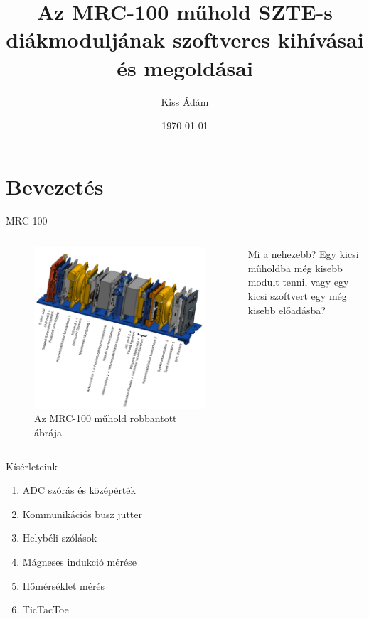 \documentclass[aspectratio=169,xcolor=dvipsnames]{beamer}
\title[short title]{Az MRC-100 műhold SZTE-s diákmoduljának szoftveres kihívásai és megoldásai} %
\subtitle{}
\author[Kiss Ádám] {Kiss Ádám}
\institute[NTU] %
{
Kiss Ádám\\
SZTE Móra Ferenc Szakkollégium\\
SZTE Elméleti Orvostudományok Doktori Iskola\\
SZTE SZAOK Élettani Intézet -- Szenzomotoros kutatólaboratórium
    \vskip 3pt
}
\date{\today} %
\begin{document}

\begin{frame}
    \titlepage
\end{frame}

\section{Bevezetés}
\begin{frame}{MRC-100}
\begin{columns}[c] 
	\begin{figure}
		\includegraphics[width=0.95\linewidth,angle=270]{mrc100}
		\caption{Az MRC-100 műhold robbantott ábrája}
	\end{figure}
	\pause
	Mi a nehezebb? Egy kicsi műholdba még kisebb modult tenni, vagy egy kicsi szoftvert egy még kisebb előadásba?
	\end{columns}
\end{frame}

\begin{frame}{Kísérleteink}
	\begin{enumerate}
		\item ADC szórás és középérték
		\item Kommunikációs busz jutter
		\item Helybéli szólások
		\item Mágneses indukció mérése
		\item Hőmérséklet mérés
		\item TicTacToe
	\end{enumerate}
\end{frame}
\end{document}
